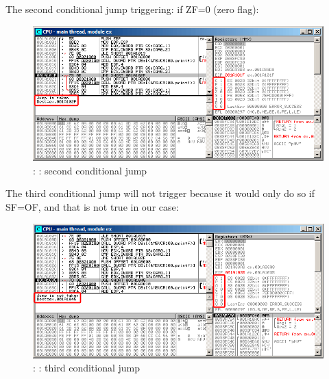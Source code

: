 \clearpage
The second \JNZ conditional jump triggering: if ZF=0 (zero flag):

\begin{figure}[H]
\centering
\includegraphics[scale=\FigScale]{patterns/07_jcc/simple/olly_signed2.png}
\caption{\olly: : second conditional jump}
\label{fig:jcc_olly_signed_2}
\end{figure}

\clearpage
The third conditional jump \JGE will not trigger because it would only do so if SF=OF, and that is not true in our case:

\begin{figure}[H]
\centering
\includegraphics[scale=\FigScale]{patterns/07_jcc/simple/olly_signed3.png}
\caption{\olly: : third conditional jump}
\label{fig:jcc_olly_signed_3}
\end{figure}

